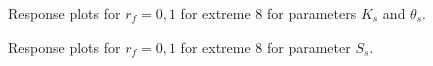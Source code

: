 \documentclass[review,times,3p,twocolumn,10pt]{elsarticle}
\begin{document}
\begin{figure}[htb!]
\label{ext6rf0-Kt3}
\caption{Response plots for $r_f=0,1$ for extreme 8 for parameters $K_s$ and $\theta_s$. }
\end{figure}

\begin{figure}[htb!]
\label{ext6rf0-Ss3}
\caption{Response plots for $r_f=0,1$ for extreme 8 for parameter $S_s$.}
\end{figure}
\end{document}
